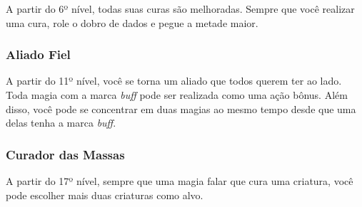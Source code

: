 \begin{multicols}{2}
A partir do 6º nível, todas suas curas são melhoradas. Sempre que você realizar
uma cura, role o dobro de dados e pegue a metade maior.

\subsubsection*{Aliado Fiel}%

A partir do 11º nível, você se torna um aliado que todos querem ter ao lado.
Toda magia com a marca \textit{buff} pode ser realizada como uma ação bônus.
Além disso, você pode se concentrar em duas magias ao mesmo tempo desde que uma
delas tenha a marca \textit{buff}.

\subsubsection*{Curador das Massas}%

A partir do 17º nível, sempre que uma magia falar que cura uma criatura, você
pode escolher mais duas criaturas como alvo.

\end{multicols}
